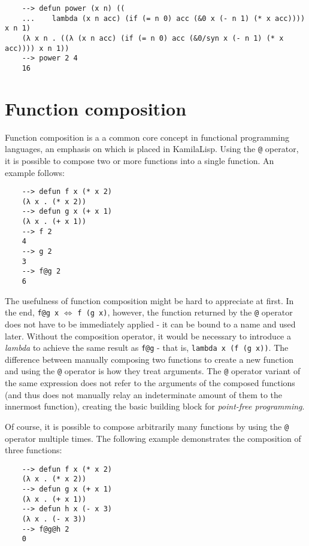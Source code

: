 \begin{Verbatim}
    --> defun power (x n) ((
    ...    lambda (x n acc) (if (= n 0) acc (&0 x (- n 1) (* x acc)))) x n 1)
    (λ x n . ((λ (x n acc) (if (= n 0) acc (&0/syn x (- n 1) (* x acc)))) x n 1))
    --> power 2 4
    16
\end{Verbatim}

\section{Function composition}

Function composition is a a common core concept in functional programming languages, an emphasis on which is placed in KamilaLisp. Using the \verb|@| operator, it is possible to compose two or more functions into a single function. An example follows:

\begin{Verbatim}
    --> defun f x (* x 2)
    (λ x . (* x 2))
    --> defun g x (+ x 1)
    (λ x . (+ x 1))
    --> f 2
    4
    --> g 2
    3
    --> f@g 2
    6
\end{Verbatim}

The usefulness of function composition might be hard to appreciate at first. In the end, \verb|f@g x| $\Leftrightarrow$ \verb|f (g x)|, however, the function returned by the \verb|@| operator does not have to be immediately applied - it can be bound to a name and used later. Without the composition operator, it would be necessary to introduce a \textit{lambda} to achieve the same result as \verb|f@g| - that is, \verb|lambda x (f (g x))|. The difference between manually composing two functions to create a new function and using the \verb|@| operator is how they treat arguments. The \verb|@| operator variant of the same expression does not refer to the arguments of the composed functions (and thus does not manually relay an indeterminate amount of them to the innermost function), creating the basic building block for \textit{point-free programming}.

Of course, it is possible to compose arbitrarily many functions by using the \verb|@| operator multiple times. The following example demonstrates the composition of three functions:

\begin{Verbatim}
    --> defun f x (* x 2)
    (λ x . (* x 2))
    --> defun g x (+ x 1)
    (λ x . (+ x 1))
    --> defun h x (- x 3)
    (λ x . (- x 3))
    --> f@g@h 2
    0
\end{Verbatim}

